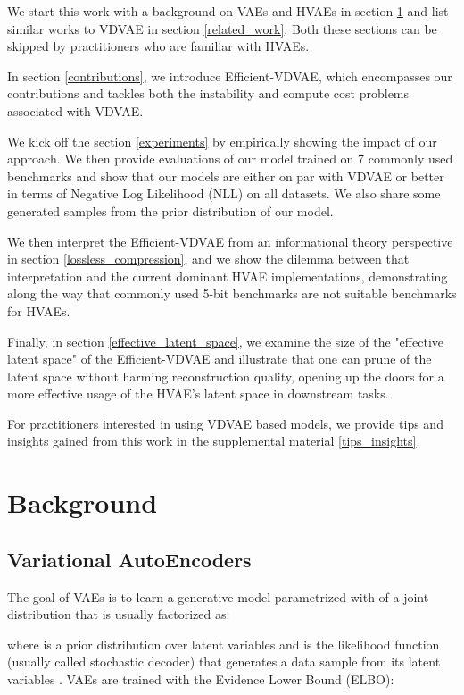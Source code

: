 \documentclass{article}
\begin{document}
We start this work with a background on VAEs and HVAEs in section \ref{background} and list similar works to VDVAE in section \ref{related_work}. Both these sections can be skipped by practitioners who are familiar with HVAEs.

In section \ref{contributions}, we introduce Efficient-VDVAE, which encompasses our contributions and tackles both the instability and compute cost problems associated with VDVAE.

We kick off the section \ref{experiments} by empirically showing the impact of our approach. We then provide evaluations of our model trained on 7 commonly used benchmarks and show that our models are either on par with VDVAE or better in terms of Negative Log Likelihood (NLL) on all datasets. We also share some generated samples from the prior distribution of our model.

We then interpret the Efficient-VDVAE from an informational theory perspective in section \ref{lossless_compression}, and we show the dilemma between that interpretation and the current dominant HVAE implementations, demonstrating along the way that commonly used 5-bit benchmarks are not suitable benchmarks for HVAEs.

Finally, in section \ref{effective_latent_space}, we examine the size of the "effective latent space" of the Efficient-VDVAE and illustrate that one can prune  of the latent space without harming reconstruction quality, opening up the doors for a more effective usage of the HVAE's latent space in downstream tasks.

For practitioners interested in using VDVAE based models, we provide tips and insights gained from this work in the supplemental material \ref{tips_insights}.

\section{Background}
\label{background}
\subsection{Variational AutoEncoders}
The goal of VAEs is to learn a generative model parametrized with  of a joint distribution  that is usually factorized as:



where  is a prior distribution over latent variables  and  is the likelihood function (usually called stochastic decoder) that generates a data sample  from its latent variables . VAEs are trained with the Evidence Lower Bound (ELBO):
\end{document}
